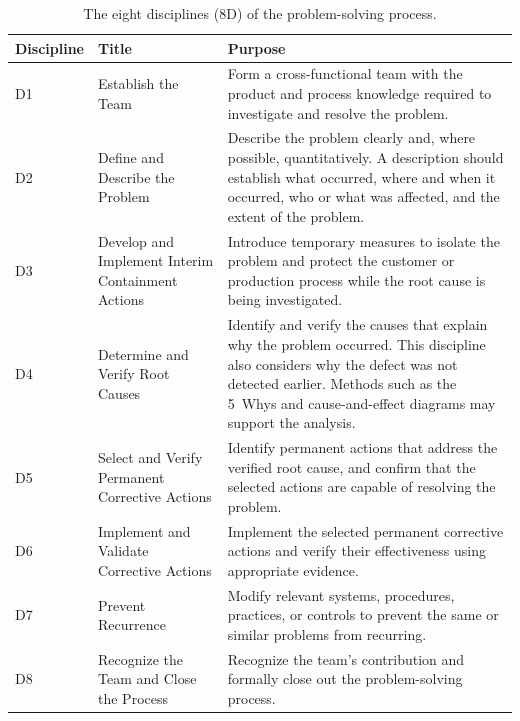 \begin{table}[tbp]
\centering
\footnotesize
\caption{The eight disciplines (8D) of the problem-solving process.}
\label{tab:8d_disciplines}
\renewcommand{\arraystretch}{1.05}
\begin{tabular}{lp{3.9cm}p{6.8cm}}
  \toprule
  \textbf{Discipline} & \textbf{Title} & \textbf{Purpose} \\
  \midrule
  D1 &
    Establish the Team &
    Form a cross-functional team with the product and process knowledge
    required to investigate and resolve the problem. \\
  \addlinespace
  D2 &
    Define and Describe the Problem &
    Describe the problem clearly and, where possible, quantitatively. A
    description should establish what occurred, where and when it
    occurred, who or what was affected, and the extent of the problem. \\
  \addlinespace
  D3 &
    Develop and Implement Interim Containment Actions &
    Introduce temporary measures to isolate the problem and protect the
    customer or production process while the root cause is being
    investigated. \\
  \addlinespace
  D4 &
    Determine and Verify Root Causes &
    Identify and verify the causes that explain why the problem occurred.
    This discipline also considers why the defect was not detected
    earlier. Methods such as the 5~Whys and cause-and-effect diagrams may
    support the analysis. \\
  \addlinespace
  D5 &
    Select and Verify Permanent Corrective Actions &
    Identify permanent actions that address the verified root cause, and
    confirm that the selected actions are capable of resolving the
    problem. \\
  \addlinespace
  D6 &
    Implement and Validate Corrective Actions &
    Implement the selected permanent corrective actions and verify their
    effectiveness using appropriate evidence. \\
  \addlinespace
  D7 &
    Prevent Recurrence &
    Modify relevant systems, procedures, practices, or controls to
    prevent the same or similar problems from recurring. \\
  \addlinespace
  D8 &
    Recognize the Team and Close the Process &
    Recognize the team's contribution and formally close out the
    problem-solving process. \\
  \bottomrule
\end{tabular}
\end{table}

